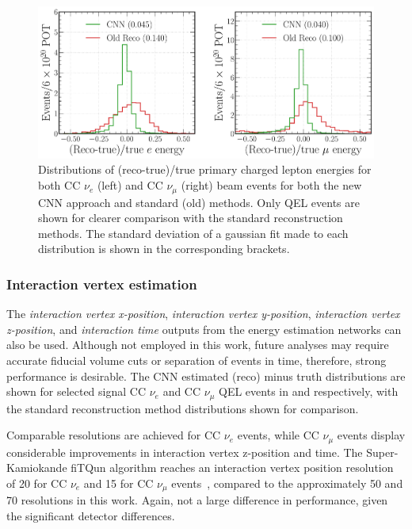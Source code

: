 \begin{figure} %
    \includegraphics[width=\textwidth]{diagrams/7-results/final_frac_e_comparison.pdf}
    \caption[Distributions of (reco-true)/true primary charged lepton energies for the CNN and
        standard methods] {Distributions of (reco-true)/true primary charged lepton energies for
        both CC $\nu_{e}$ (left) and CC $\nu_{\mu}$ (right) beam events for both the new CNN
        approach and standard (old) methods. Only QEL events are shown for clearer comparison with
        the standard reconstruction methods. The standard deviation of a gaussian fit made to each
        distribution is shown in the corresponding brackets.}
    \label{fig:final_frac_e_comparison}
\end{figure}

\subsubsection*{Interaction vertex estimation} %

The \emph{interaction vertex x-position}, \emph{interaction vertex y-position}, \emph{interaction
    vertex z-position}, and \emph{interaction time} outputs from the energy estimation networks
    can also be used. Although not employed in this work, future analyses may require accurate
    fiducial volume cuts or separation of events in time, therefore, strong performance is
    desirable. The CNN estimated (reco) minus truth distributions are shown for selected signal CC
    $\nu_{e}$ and CC $\nu_{\mu}$ QEL events in 
    and  respectively, with the standard
    reconstruction method distributions shown for comparison.

Comparable resolutions are achieved for CC $\nu_{e}$ events, while CC $\nu_{\mu}$ events display
considerable improvements in interaction vertex z-position and time. The Super-Kamiokande fiTQun
algorithm reaches an interaction vertex position resolution of \unit{20}{} for CC
$\nu_{e}$ and \unit{15}{} for CC $\nu_{\mu}$ events~\cite{jiang2019}, compared to the
approximately \unit{50}{} and \unit{70}{} resolutions in this work. Again, not a
large difference in performance, given the significant detector differences.

